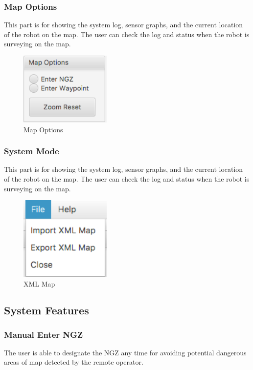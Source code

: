 \documentclass[10pt,a4paper,titlepage]{article}
\begin{document}
  \subsubsection{  Map Options} 
This part is for showing the system log, sensor graphs, and the current location of the robot on the map. The user can check the log and status when the robot is surveying on the map.  \begin{figure}[H] 
  \includegraphics[width=0.4\textwidth]{options.png}  %
  \caption{Map Options} 
  \label{fig:Map Options}               
  \end{figure} 
   
   
  \subsubsection{  System Mode} 
This part is for showing the system log, sensor graphs, and the current location of the robot on the map. The user can check the log and status when the robot is surveying on the map.  \begin{figure}[H] 
  \includegraphics[width=0.4\textwidth]{xml.png}  %
  \caption{XML Map} 
  \label{fig:XML Map}               
  \end{figure} 
  
 
 
  \subsection{System Features} 
   
  \subsubsection{Manual Enter NGZ} 
  The user is able to designate the NGZ any time for avoiding potential dangerous areas of map detected by the remote operator. 
 
\end{document}
